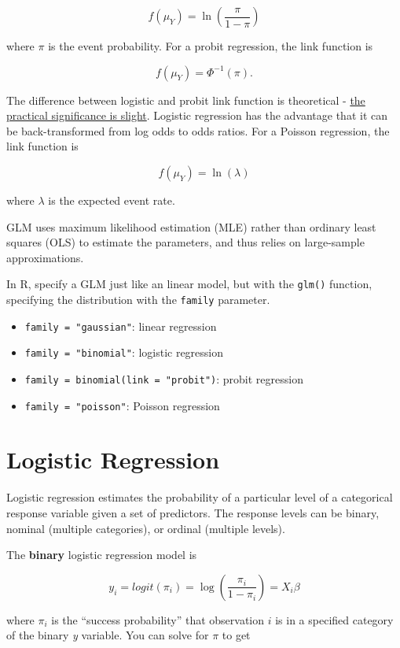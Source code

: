\documentclass[
]{book}
\providecommand{\tightlist}{%
  \setlength{\itemsep}{0pt}\setlength{\parskip}{0pt}}
\begin{document}
\[f(\mu_Y) = \ln(\frac{\pi}{1-\pi})\]

where \(\pi\) is the event probability. For a probit regression, the link function is

\[f(\mu_Y) = \Phi^{-1}(\pi).\]

The difference between logistic and probit link function is theoretical - \href{https://www.theanalysisfactor.com/the-difference-between-logistic-and-probit-regression/}{the practical significance is slight}. Logistic regression has the advantage that it can be back-transformed from log odds to odds ratios. For a Poisson regression, the link function is

\[f(\mu_Y) = \ln(\lambda)\]

where \(\lambda\) is the expected event rate.

GLM uses maximum likelihood estimation (MLE) rather than ordinary least squares (OLS) to estimate the parameters, and thus relies on large-sample approximations.

In R, specify a GLM just like an linear model, but with the \texttt{glm()} function, specifying the distribution with the \texttt{family} parameter.

\begin{itemize}
\tightlist
\item
  \texttt{family\ =\ "gaussian"}: linear regression
\item
  \texttt{family\ =\ "binomial"}: logistic regression
\item
  \texttt{family\ =\ binomial(link\ =\ "probit")}: probit regression
\item
  \texttt{family\ =\ "poisson"}: Poisson regression
\end{itemize}

\hypertarget{logistic-regression}{%
\section{Logistic Regression}\label{logistic-regression}}

Logistic regression estimates the probability of a particular level of a categorical response variable given a set of predictors. The response levels can be binary, nominal (multiple categories), or ordinal (multiple levels).

The \textbf{binary} logistic regression model is

\[y_i = logit(\pi_i) = \log\left(\frac{\pi_i}{1-\pi_i}\right) = X_i\beta\]

where \(\pi_i\) is the ``success probability'' that observation \(i\) is in a specified category of the binary \emph{y} variable. You can solve for \(\pi\) to get
\end{document}
